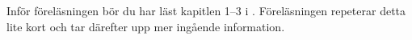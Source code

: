 Inför föreläsningen bör du har läst kapitlen 1--3 i \cite{Oetiker2011lshort}.
Föreläsningen repeterar detta lite kort och tar därefter upp mer ingående 
information.
